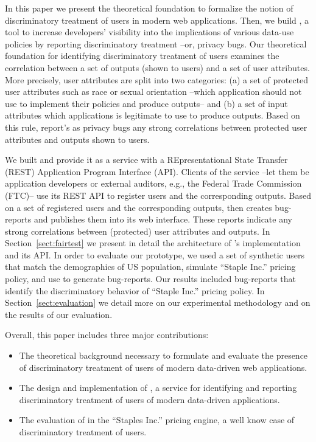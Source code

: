 In this paper we present the theoretical foundation to formalize the notion of
discriminatory treatment of users in modern web applications. Then, we build
\sysname, a tool to increase developers’ visibility into the implications of
various data-use policies by reporting discriminatory treatment --or,
privacy bugs. Our theoretical foundation for identifying discriminatory
treatment of users examines the correlation between a set of outputs (shown to
users) and a set of user attributes. More precisely, user attributes are split
into two categories: (a) a set of protected user attributes such as race or
sexual orientation --which application should not use to implement their
policies and produce outputs-- and (b) a set of input attributes which
applications is legitimate to use to produce outputs. Based on this rule,
\sysname report's as privacy bugs any strong correlations between protected
user attributes and outputs shown to users.

We built \sysname and provide it as a service with a REpresentational
State Transfer (REST) Application Program Interface (API). Clients of the 
\sysname service --let them be application developers or external auditors,
e.g., the Federal Trade Commission (FTC)-- use its REST API to register users
and the corresponding outputs. Based on a set of registered users and the
corresponding outputs, \sysname then creates bug-reports and publishes them
into its web interface. These reports indicate any strong correlations between
(protected) user attributes and outputs. In Section~\ref{sect:fairtest} we
present in detail the architecture of \sysname's implementation and its API.
In order to evaluate our \sysname prototype, we used a set of synthetic users
that match the demographics of US population, simulate ``Staple Inc.'' pricing
policy, and use \sysname to generate bug-reports. Our results included
bug-reports that identify the discriminatory behavior of ``Staple  Inc.''
pricing policy. In Section~\ref{sect:evaluation} we detail more on our
experimental methodology and on the results of our evaluation.

Overall, this paper includes three major contributions:
\begin{itemize}
  \item The theoretical background necessary to formulate and evaluate the
    presence of discriminatory treatment of users of modern data-driven web
    applications.
  \item The design and implementation of \sysname, a service for identifying
    and reporting discriminatory treatment of users of modern data-driven
    applications.
  \item The evaluation of \sysname in the ``Staples Inc.'' pricing engine, a
    well know case of discriminatory treatment of users.
\end{itemize}

